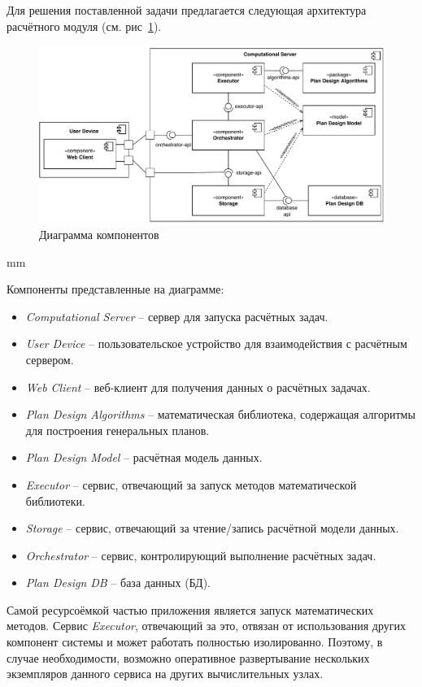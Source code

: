 Для решения поставленной задачи предлагается следующая архитектура расчётного модуля
(см. рис\ \ref{pic:architecture__common-component}).

\begin{figure}[H]
	\hspace*{-2.5 cm}\includegraphics[width=1.2\textwidth, left]{architecture/pictures/common/component}
	\caption{Диаграмма компонентов}
	\label{pic:architecture__common-component}
\end{figure}
 mm

\noindent Компоненты представленные на диаграмме:
\begin{itemize}
	\item \textit{Computational Server} -- сервер для запуска расчётных задач.
	\item \textit{User Device} -- пользовательское устройство для взаимодействия с расчётным сервером.
	\item \textit{Web Client} -- веб-клиент для получения данных о расчётных задачах.
	\item \textit{Plan Design Algorithms} -- математическая библиотека, содержащая алгоритмы
	для построения генеральных планов.
	\item \textit{Plan Design Model} -- расчётная модель данных.
	\item \textit{Executor} -- сервис, отвечающий за запуск методов математической библиотеки.
	\item \textit{Storage} -- сервис, отвечающий за чтение/запись расчётной модели данных.
	\item \textit{Orchestrator} -- сервис, контролирующий выполнение расчётных задач.
	\item \textit{Plan Design DB} -- база данных (БД).
\end{itemize}

Самой ресурсоёмкой частью приложения является запуск математических методов.
Сервис \textit{Executor}, отвечающий за это, отвязан от использования других компонент системы
и может работать полностью изолированно.
Поэтому, в случае необходимости, возможно оперативное развертывание нескольких экземпляров данного сервиса
на других вычислительных узлах.

